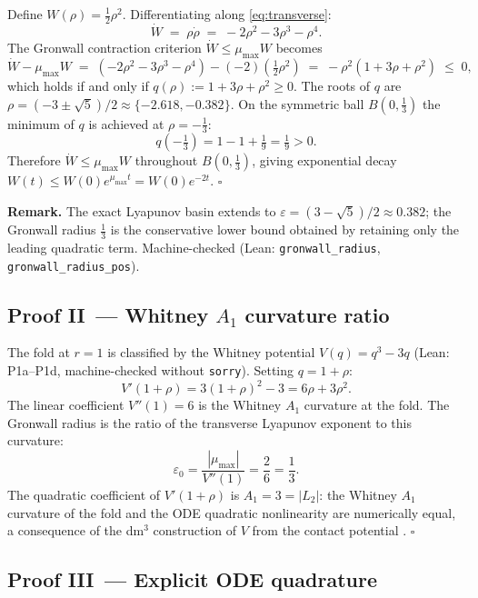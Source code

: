 \documentclass[14pt,a4paper]{extarticle}
\begin{document}
Define $W(\rho) = \tfrac{1}{2}\rho^2$.  Differentiating along \eqref{eq:transverse}:
\[
  \dot W \;=\; \rho\dot\rho \;=\; -2\rho^2 - 3\rho^3 - \rho^4.
\]
The Gronwall contraction criterion $\dot W \le \mu_{\max} W$ becomes
\[
  \dot W - \mu_{\max}W
  \;=\; (-2\rho^2 - 3\rho^3 - \rho^4) - (-2)(\tfrac{1}{2}\rho^2)
  \;=\; -\rho^2(1 + 3\rho + \rho^2)
  \;\le\; 0,
\]
which holds if and only if $q(\rho) := 1 + 3\rho + \rho^2 \ge 0$.
The roots of $q$ are $\rho = (-3 \pm \sqrt{5})/2 \approx \{-2.618, -0.382\}$.
On the symmetric ball $B(0, \tfrac{1}{3})$ the minimum of $q$ is achieved at
$\rho = -\tfrac{1}{3}$:
\[
  q\!\left(-\tfrac{1}{3}\right)
    = 1 - 1 + \tfrac{1}{9} = \tfrac{1}{9} > 0.
\]
Therefore $\dot W \le \mu_{\max} W$ throughout $B(0,\tfrac{1}{3})$,
giving exponential decay $W(t) \le W(0)e^{\mu_{\max}t} = W(0)e^{-2t}$.
\hfill$\square$

\medskip\noindent\textbf{Remark.}
The exact Lyapunov basin extends to $\varepsilon = (3-\sqrt{5})/2 \approx 0.382$;
the Gronwall radius $\tfrac{1}{3}$ is the conservative lower bound
obtained by retaining only the leading quadratic term.
Machine-checked (Lean: \texttt{gronwall\_radius}, \texttt{gronwall\_radius\_pos}).

\subsection*{Proof II\, — Whitney $A_1$ curvature ratio}

The fold at $r=1$ is classified by the Whitney potential $V(q)=q^3-3q$
(Lean: P1a--P1d, machine-checked without \texttt{sorry}).
Setting $q = 1+\rho$:
\[
  V'(1+\rho) = 3(1+\rho)^2 - 3 = 6\rho + 3\rho^2.
\]
The linear coefficient $V''(1) = 6$ is the Whitney $A_1$ curvature at the fold.
The Gronwall radius is the ratio of the transverse Lyapunov exponent to this curvature:
\[
  \varepsilon_0
    = \frac{|\mu_{\max}|}{V''(1)}
    = \frac{2}{6}
    = \frac{1}{3}.
\]
The quadratic coefficient of $V'(1+\rho)$ is $A_1 = 3 = |L_2|$:
the Whitney $A_1$ curvature of the fold and the ODE quadratic nonlinearity
are numerically equal, a consequence of the dm$^3$ construction of $V$
from the contact potential \cite{Grossi2026_Vol2}.
\hfill$\square$

\subsection*{Proof III\, — Explicit ODE quadrature}
\end{document}
